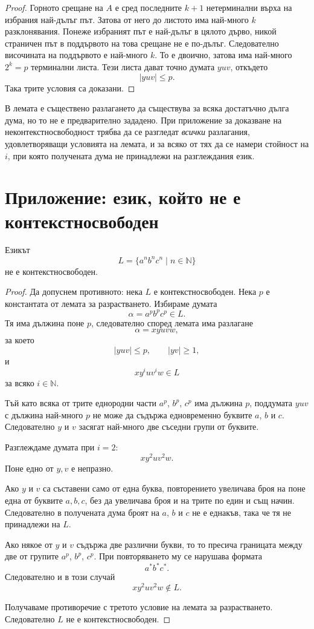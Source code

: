 \begin{proof}
Горното срещане на $A$ е сред последните $k+1$ нетерминални върха на избрания най-дълъг път. Затова от него до листото има най-много $k$ разклонявания. Понеже избраният път е най-дълъг в цялото дърво, никой страничен път в поддървото на това срещане не е по-дълъг. Следователно височината на поддървото е най-много $k$. То е двоично, затова има най-много $2^k=p$ терминални листа. Тези листа дават точно думата $yuv$, откъдето
\[
|yuv|\leq p.
\]
Така трите условия са доказани.
\end{proof}

\begin{remark}
В лемата е съществено разлагането да съществува за всяка достатъчно дълга дума, но то не е предварително зададено. При приложение за доказване на неконтекстносвободност трябва да се разгледат \emph{всички} разлагания, удовлетворяващи условията на лемата, и за всяко от тях да се намери стойност на $i$, при която получената дума не принадлежи на разглеждания език.
\end{remark}

\section{Приложение: език, който не е контекстносвободен}\label{s:5.3}

\begin{example}
Езикът
\[
L=\{a^n b^n c^n\mid n\in\mathbb{N}\}
\]
не е контекстносвободен.
\end{example}

\begin{proof}
Да допуснем противното: нека $L$ е контекстносвободен. Нека $p$ е константата от лемата за разрастването. Избираме думата
\[
\alpha=a^p b^p c^p\in L.
\]
Тя има дължина поне $p$, следователно според лемата има разлагане
\[
\alpha=xyuvw,
\]
за което
\[
|yuv|\leq p,
\qquad
|yv|\geq 1,
\]
и
\[
xy^iuv^iw\in L
\]
за всяко $i\in\mathbb{N}$.

Тъй като всяка от трите еднородни части $a^p$, $b^p$, $c^p$ има дължина $p$, поддумата $yuv$ с дължина най-много $p$ не може да съдържа едновременно буквите $a$, $b$ и $c$. Следователно $y$ и $v$ засягат най-много две съседни групи от буквите.

Разглеждаме думата при $i=2$:
\[
xy^2uv^2w.
\]
Поне едно от $y,v$ е непразно.

Ако $y$ и $v$ са съставени само от една буква, повторението увеличава броя на поне една от буквите $a,b,c$, без да увеличава броя и на трите по един и същ начин. Следователно в получената дума броят на $a$, $b$ и $c$ не е еднакъв, така че тя не принадлежи на $L$.

Ако някое от $y$ и $v$ съдържа две различни букви, то то пресича границата между две от групите $a^p$, $b^p$, $c^p$. При повторяването му се нарушава формата
\[
a^*b^*c^*.
\]
Следователно и в този случай
\[
xy^2uv^2w\notin L.
\]

Получаваме противоречие с третото условие на лемата за разрастването. Следователно $L$ не е контекстносвободен.
\end{proof}

